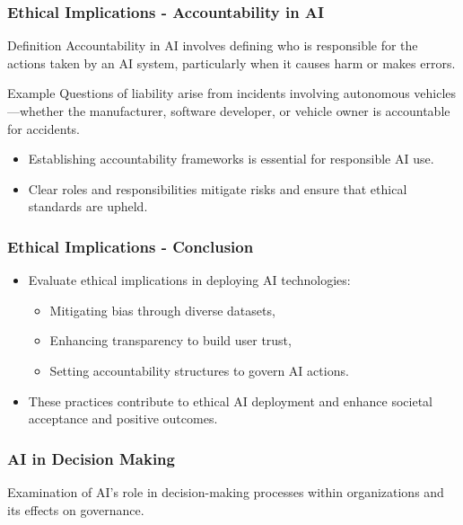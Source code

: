 \documentclass[aspectratio=169]{beamer}
\begin{document}
\begin{frame}[fragile]
    \frametitle{Ethical Implications - Accountability in AI}
    \begin{block}{Definition}
        Accountability in AI involves defining who is responsible for the actions taken by an AI system, particularly when it causes harm or makes errors.
    \end{block}
    
    \begin{block}{Example}
        Questions of liability arise from incidents involving autonomous vehicles—whether the manufacturer, software developer, or vehicle owner is accountable for accidents.
    \end{block}

    \begin{itemize}
        \item Establishing accountability frameworks is essential for responsible AI use.
        \item Clear roles and responsibilities mitigate risks and ensure that ethical standards are upheld.
    \end{itemize}
\end{frame}

\begin{frame}[fragile]
    \frametitle{Ethical Implications - Conclusion}
    \begin{itemize}
        \item Evaluate ethical implications in deploying AI technologies:
        \begin{itemize}
            \item Mitigating bias through diverse datasets,
            \item Enhancing transparency to build user trust,
            \item Setting accountability structures to govern AI actions.
        \end{itemize}
        \item These practices contribute to ethical AI deployment and enhance societal acceptance and positive outcomes.
    \end{itemize}
\end{frame}

\begin{frame}[fragile]
    \frametitle{AI in Decision Making}
    Examination of AI's role in decision-making processes within organizations and its effects on governance.
\end{frame}
\end{document}
